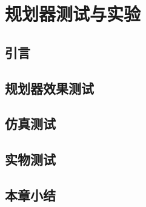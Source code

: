
\chapter{规划器测试与实验}\label{chap:experiments}

\section{引言}\label{sec:intro_5}

\section{规划器效果测试}\label{sec:algorithm_performance}

\section{仿真测试}\label{sec:simulation_experiments}

\section{实物测试}\label{sec:real_world_experiments}

\section{本章小结}\label{sec:summary_5}
